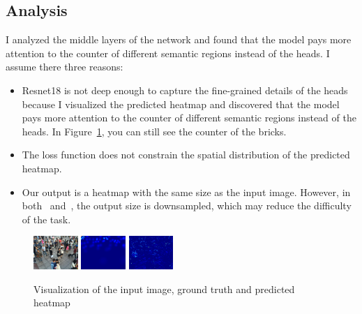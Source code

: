 \documentclass[10pt,twocolumn,letterpaper]{article}
\begin{document}
    \subsection{Analysis}
    \par I analyzed the middle layers of the network and found that the model pays more attention to the counter of different semantic regions
    instead of the heads. I assume there three reasons:
    \begin{itemize}
        \item Resnet18 is not deep enough to capture the fine-grained details of the heads because I visualized the predicted heatmap and discovered that the model pays more attention to
        the counter of different semantic regions instead of the heads.
        In Figure~\ref{fig:heatmap}, you can still see the counter of the bricks.
        \item The loss function does not constrain the spatial distribution of the predicted heatmap.
        \item Our output is a heatmap with the same size as the input image.
        However, in both~\cite{zhang2016single} and~\cite{wang2019learning}, the output size is downsampled, which may
        reduce the difficulty of the task.
    \end{itemize}
    \begin{center}
        \begin{figure}
            \includegraphics[width=0.15\textwidth]{images/input}
            \includegraphics[width=0.15\textwidth]{images/gt}
            \includegraphics[width=0.15\textwidth]{images/pred_heat_map}
            \caption{Visualization of the input image, ground truth and predicted heatmap}
            \label{fig:heatmap}
        \end{figure}
    \end{center}



    {\small
    
    
    }
\end{document}

